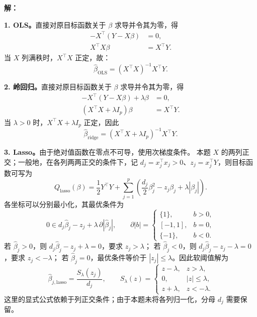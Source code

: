 \documentclass[12pt,a4paper]{article}
\begin{document}
\begin{answerbox}
\textbf{解：}

\textbf{1. OLS。}直接对原目标函数关于 $\beta$ 求导并令其为零，得
\begin{align*}
-X^{\top}(Y-X\beta)&=0,\\
X^{\top}X\beta&=X^{\top}Y.
\end{align*}
当 $X$ 列满秩时，$X^{\top}X$ 正定，故：
\begin{equation*}
\hat\beta_{\mathrm{OLS}}=(X^{\top}X)^{-1}X^{\top}Y.
\end{equation*}

\textbf{2. 岭回归。}直接对原目标函数关于 $\beta$ 求导并令其为零，得
\begin{align*}
-X^{\top}(Y-X\beta)+\lambda\beta&=0,\\
(X^{\top}X+\lambda I_p)\beta&=X^{\top}Y.
\end{align*}
当 $\lambda>0$ 时，$X^{\top}X+\lambda I_p$ 正定，因此
\begin{equation*}
\hat\beta_{\mathrm{ridge}}
=(X^{\top}X+\lambda I_p)^{-1}X^{\top}Y.
\end{equation*}

\textbf{3. Lasso。}由于绝对值函数在零点不可导，使用次梯度条件。
本题 $X$ 的两列正交；一般地，在各列两两正交的条件下，记
$d_j=x_j^{\top}x_j>0$、$z_j=x_j^{\top}Y$，则目标函数可写为
\begin{equation*}
Q_{\mathrm{lasso}}(\beta)
=\frac12Y^{\top}Y+
\sum_{j=1}^{p}\left(\frac{d_j}{2}\beta_j^2-z_j\beta_j+\lambda|\beta_j|\right).
\end{equation*}
各坐标可以分别最小化，其最优条件为
\begin{equation*}
0\in d_j\hat\beta_j-z_j+\lambda\,\partial|\hat\beta_j|,
\qquad
\partial|b|=
\begin{cases}
\{1\},&b>0,\\
[-1,1],&b=0,\\
\{-1\},&b<0.
\end{cases}
\end{equation*}
若 $\hat\beta_j>0$，则 $d_j\hat\beta_j-z_j+\lambda=0$，要求 $z_j>\lambda$；
若 $\hat\beta_j<0$，则 $d_j\hat\beta_j-z_j-\lambda=0$，要求 $z_j<-\lambda$；
若 $\hat\beta_j=0$，最优条件等价于 $|z_j|\le\lambda$。因此软阈值解为
\begin{equation*}
\hat\beta_{j,\mathrm{lasso}}
=\frac{S_{\lambda}(z_j)}{d_j},\qquad
S_{\lambda}(z)=
\begin{cases}
z-\lambda,&z>\lambda,\\
0,&|z|\le\lambda,\\
z+\lambda,&z<-\lambda.
\end{cases}
\end{equation*}
这里的显式公式依赖于列正交条件；由于本题未将各列归一化，分母 $d_j$ 需要保留。


\end{answerbox}
\end{document}
